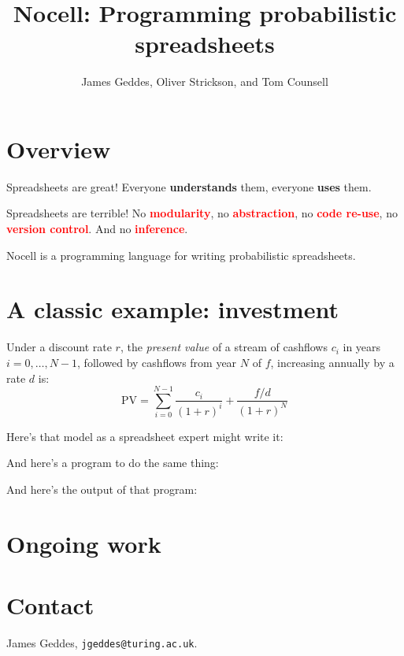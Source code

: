 \documentclass[twocolumn, 12pt]{article}
\title{Nocell: Programming prob\-ab\-il\-ist\-ic spreadsheets}
\author{James Geddes, Oliver Strickson, and Tom Counsell}
\date{}
\newlength{\gridv}\setlength{\gridv}{0.11111111111111111\paperheight}
\newlength{\gridh}\setlength{\gridh}{0.04761904761904762\paperwidth}
\begin{document}
\maketitle
\thispagestyle{empty}
\section*{Overview}
Spreadsheets are great! Everyone \textcolor{OliveGreen}{\bfseries understands} them, everyone
\textcolor{OliveGreen}{\bfseries uses} them.

Spreadsheets are terrible! No \textcolor{red}{\bfseries modularity}, no
\textcolor{red}{\bfseries abstraction}, no \textcolor{red}{\bfseries code re-use}, no
\textcolor{red}{\bfseries version control}. And no \textcolor{red}{\bfseries inference}.

Nocell is a programming language for writing probabilistic spreadsheets.

\section*{A classic example: investment}
Under a discount rate $r$, the \emph{present value} of a stream of cashflows $c_i$ in years
$i=0,\dotsc,N-1$, followed by cashflows from year $N$ of $f$, increasing annually by a rate $d$ is:
\[
\text{PV} = \sum_{i = 0}^{N-1} \frac{c_i}{{(1 + r)}^{i}}
  + \frac{f/d}{{(1+r)}^N}
\]

Here's that model as a spreadsheet expert might write it:

And here's a program to do the same thing:

And here's the output of that program:


\section*{Ongoing work}


\vfill
\section*{Contact}

James Geddes, \texttt{jgeddes@turing.ac.uk}.
\end{document}
